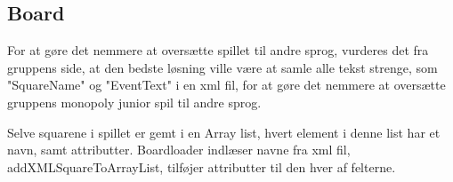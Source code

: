 \documentclass[../../main.tex]{subfiles}
\begin{document}
\subsection{Board}

For at gøre det nemmere at oversætte spillet til andre sprog, vurderes det fra gruppens side, at den bedste løsning ville være at samle alle tekst strenge, som "SquareName" og "EventText" i en xml fil, for at gøre det nemmere at oversætte gruppens monopoly junior spil til andre sprog. 

Selve squarene i spillet er gemt i en Array list, hvert element i denne list har et navn, samt attributter. 
Boardloader indlæser navne fra xml fil, addXMLSquareToArrayList, tilføjer attributter til den hver af felterne.
\end{document}
